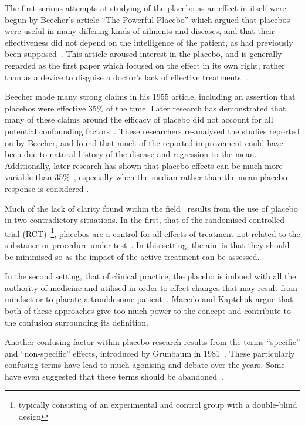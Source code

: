 The first serious attempts at studying of the placebo as an effect in itself  were begun by Beecher's article ``The Powerful Placebo'' which argued that placebos were useful in many differing kinds of ailments and diseases, and that their effectiveness did not depend on the intelligence of the patient, as had previously been supposed~\cite{beecher1955powerful}.  This article aroused interest in the placebo, and is generally regarded as the first paper which focused on the effect in its own right, rather than as a device to disguise a doctor's lack of effective treatments~\cite{beecher1955powerful,Kaptchuk1998}. 

Beecher made many strong claims in his 1955 article, including an assertion that placebos were effective 35\% of the time. Later research has demonstrated that many of these claims around the efficacy of placebo did not account for all potential confounding factors~\cite{Kienle1998}. These researchers re-analysed the studies reported on by Beecher, and found that much of the reported improvement could have been due to natural history of the disease and regression to the mean. Additionally, later research has shown that placebo effects can be much more variable than 35\%~\cite{Turner1994}, especially when the median rather than the mean placebo response is considered \cite{McQuay1996}.   

Much of the lack of clarity found within the field~\cite{Macedo2003,Kaptchuk1998} results from the use of placebo in two contradictory situations. In the first, that of the randomised controlled trial (RCT)~\footnote{typically consisting of an experimental and control group with a double-blind design}, placebos are a control for all effects of treatment not related to the substance or procedure under test~\cite{Vickers2000}. In this setting, the aim is that they should be minimised so as the impact of the active treatment can be assessed.  

In the second setting, that  of clinical practice, the placebo is imbued with all the authority of medicine and utilised in order to effect changes that may result from mindset or to placate a troublesome patient~\cite{Bootzin2003,Sherman2008}. Macedo and Kaptchuk argue that both of these approaches give too much power to the concept and contribute to the confusion surrounding its definition. 

Another confusing factor within placebo research results from the terms ``specific'' and ``non-specific'' effects, introduced by Grunbaum in 1981~\cite{grunbaum1981placebo}. These particularly confusing terms have lead to much agonising and debate over the years. Some have even suggested that these terms should be abandoned~\cite{Caspi2002}. 

